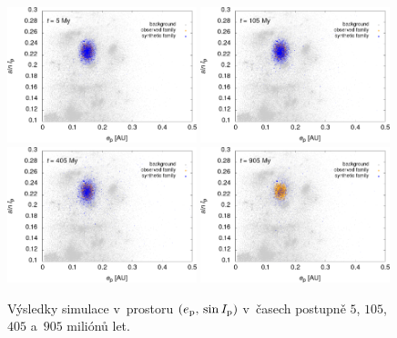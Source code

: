 \documentclass[A4paper, 12pt, oneside]{book}
\begin{document}
\immediate{}
\immediate{}
\immediate{}
\immediate{}
\begin{figure}
	\centering
	\includegraphics[width=0.49\textwidth]{obr/ei_5t.png}
	\includegraphics[width=0.49\textwidth]{obr/ei_105t.png}\\
	\includegraphics[width=0.49\textwidth]{obr/ei_405t.png}
	\includegraphics[width=0.49\textwidth]{obr/ei_905t.png}
	\caption{Výsledky simulace v~prostoru $(e_{\rm p},\,\sin I_{\rm p})$ v~časech postupně $5$, $105$, $405$ a~$905$ miliónů let.} \label{fig:ei_sim}
\end{figure}
\end{document}
